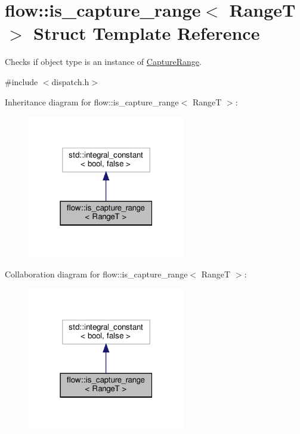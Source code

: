\hypertarget{structflow_1_1is__capture__range}{}\section{flow\+:\+:is\+\_\+capture\+\_\+range$<$ RangeT $>$ Struct Template Reference}
\label{structflow_1_1is__capture__range}


Checks if object type is an instance of \hyperlink{structflow_1_1_capture_range}{Capture\+Range}.  




{\ttfamily \#include $<$dispatch.\+h$>$}



Inheritance diagram for flow\+:\+:is\+\_\+capture\+\_\+range$<$ RangeT $>$\+:
\nopagebreak
\begin{figure}[H]
\begin{center}
\leavevmode
\includegraphics[width=195pt]{structflow_1_1is__capture__range__inherit__graph}
\end{center}
\end{figure}


Collaboration diagram for flow\+:\+:is\+\_\+capture\+\_\+range$<$ RangeT $>$\+:
\nopagebreak
\begin{figure}[H]
\begin{center}
\leavevmode
\includegraphics[width=195pt]{structflow_1_1is__capture__range__coll__graph}
\end{center}
\end{figure}


